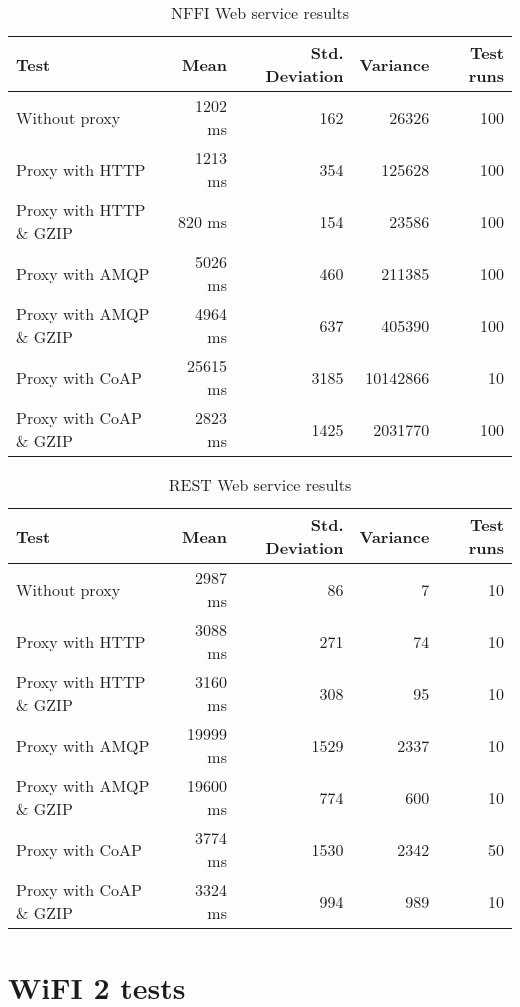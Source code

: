\begin{appendices}
\begin{table}[H]
\begin{tabular}{| l | r | r | r | r |}
\hline
  \textbf{Test} & \textbf{Mean} & \textbf{Std. Deviation} & \textbf{Variance} & \textbf{Test runs}\\ \hline
  Without proxy & 1202 ms & 162 & 26326 & 100 \\ \hline
  Proxy with HTTP & 1213 ms & 354 & 125628 & 100 \\ \hline
  Proxy with HTTP \& GZIP & 820 ms & 154 & 23586 & 100 \\ \hline
  Proxy with AMQP & 5026 ms & 460 & 211385 & 100 \\ \hline
  Proxy with AMQP \& GZIP & 4964 ms & 637 & 405390 & 100\\ \hline
  Proxy with CoAP & 25615 ms & 3185 & 10142866 & 10 \\ \hline
  Proxy with CoAP \& GZIP & 2823 ms & 1425 & 2031770 & 100 \\ \hline
\end{tabular}
\caption{NFFI Web service results}
\end{table}


\begin{table}[H]
\begin{tabular}{| l | r | r | r | r |}
\hline
  \textbf{Test} & \textbf{Mean} & \textbf{Std. Deviation} & \textbf{Variance} & \textbf{Test runs}\\ \hline
  Without proxy & 2987 ms & 86 & 7 & 10 \\ \hline
  Proxy with HTTP & 3088 ms & 271 & 74 & 10 \\ \hline
  Proxy with HTTP \& GZIP & 3160 ms & 308 & 95 & 10 \\ \hline
  Proxy with AMQP & 19999 ms & 1529 & 2337 & 10 \\ \hline
  Proxy with AMQP \& GZIP & 19600 ms & 774 & 600 & 10\\ \hline
  Proxy with CoAP & 3774 ms & 1530 & 2342 & 50 \\ \hline
  Proxy with CoAP \& GZIP & 3324 ms & 994 & 989 & 10 \\ \hline
\end{tabular}
\caption{REST Web service results}
\end{table}




\section{WiFI 2 tests}


\end{appendices}
